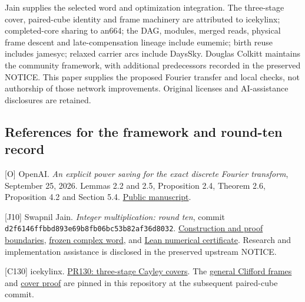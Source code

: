 \documentclass[
  11pt,
]{article}
\begin{document}
Jain supplies the selected word and optimization integration. The
three-stage cover, paired-cube identity and frame machinery are
attributed to icekylinx; completed-core sharing to an664; the DAG,
modules, merged reads, physical frame descent and late-compensation
lineage include eumemic; birth reuse includes jamesyc; relaxed carrier
arcs include DaysSky. Douglas Colkitt maintains the community framework,
with additional predecessors recorded in the preserved NOTICE. This
paper supplies the proposed Fourier transfer and local checks, not
authorship of those network improvements. Original licenses and
AI-assistance disclosures are retained.

\subsection{References for the framework and round-ten
record}\label{references-for-the-framework-and-round-ten-record}

{[}O{]} OpenAI. \emph{An explicit power saving for the exact discrete
Fourier transform}, September 25, 2026. Lemmas 2.2 and 2.5, Proposition
2.4, Theorem 2.6, Proposition 4.2 and Section 5.4.
\href{https://github.com/openai/math/blob/main/preprints/An-explicit-power-saving-for-the-exact-discrete-Fourier-transform-September-25-2026/main.pdf}{Public
manuscript}.

{[}J10{]} Swapnil Jain. \emph{Integer multiplication: round ten}, commit
\texttt{d2f6146ffb\allowbreak{}bd893e69b8\allowbreak{}fb06bc53b8\allowbreak{}2af36d8032}.
\href{https://github.com/Swapnil-jain/integer-mult-kappa/blob/d2f6146ffbbd893e69b8fb06bc53b82af36d8032/README.md}{Construction
and proof boundaries},
\href{https://github.com/Swapnil-jain/integer-mult-kappa/blob/d2f6146ffbbd893e69b8fb06bc53b82af36d8032/certificates/round10/cx_prefix_word_p11.json.gz}{frozen
complex word}, and
\href{https://github.com/Swapnil-jain/integer-mult-kappa/blob/d2f6146ffbbd893e69b8fb06bc53b82af36d8032/lean/Round10.lean}{Lean
numerical certificate}. Research and implementation assistance is
disclosed in the preserved upstream NOTICE.

{[}C130{]} icekylinx.
\href{https://github.com/CrocSwap/integer-mult-bounds/pull/130}{PR130:
three-stage Cayley covers}. The
\href{https://github.com/icekylinx/integer-mult-bounds/blob/c8b22bc5c10dba497ac25804e27d9647d818e2ff/notes/general-clifford-frames.tex}{general
Clifford frames} and
\href{https://github.com/icekylinx/integer-mult-bounds/blob/c8b22bc5c10dba497ac25804e27d9647d818e2ff/notes/three-stage-cover-complex.tex}{cover
proof} are pinned in this repository at the subsequent paired-cube
commit.
\end{document}
